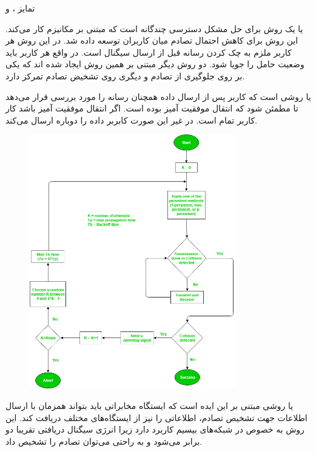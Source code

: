 \Problem
{تمایز ،  و }
{
یا
یک روش برای حل مشکل دسترسی چندگانه است که مبتنی بر مکانیزم
کار می‌کند.
این روش برای کاهش احتمال تصادم میان کاربران توسعه داده شد.
در این روش هر کاربر ملزم به چک کردن رسانه قبل از ارسال سیگنال است.
در واقع هر کاربر باید وضعیت حامل را جویا شود.
دو روش دیگر مبتنی بر همین روش ایجاد شده اند که یکی بر روی جلوگیری از تصادم و دیگری روی تشخیض تصادم تمرکز دارد.

یا
روشی است که کاربر پس از ارسال داده همچنان رسانه را مورد بررسی قرار می‌دهد تا مطمئن شود که انتقال موفقیت آمیز بوده است.
اگر انتقال موفقیت آمیز باشد کار کاربر تمام است. در غیر این صورت کابربر داده را دوباره ارسال می‌کند.

\begin{figure}[H]
    \includegraphics[width=9cm]{Images/CSMA_CD.png}
    \centering
    \caption{}
\end{figure}


یا
روشی مبتنی بر این ایده است که ایستگاه مخابراتی باید بتواند همزمان با ارسال اطلاعات جهت تشخیص تصادم، اطلاعاتی را نیز از ایستگاه‌های مختلف دریافت کند.
این روش به خصوص در شبکه‌های بیسیم کاربرد دارد زیرا انرژی سیگنال دریافتی تقریبا دو برابر می‌شود و به راحتی می‌توان تصادم را تشخیص داد.

}

